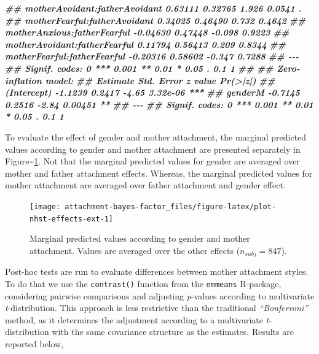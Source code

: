 \documentclass[
]{book}
\newenvironment{Shaded}{\begin{snugshade}}{\end{snugshade}}
\newcommand{\DocumentationTok}[1]{\textcolor[rgb]{0.56,0.35,0.01}{\textbf{\textit{#1}}}}
\begin{document}
\begin{Shaded}
\begin{Highlighting}[]
\DocumentationTok{\#\# motherAvoidant:fatherAvoidant  0.63111    0.32765   1.926   0.0541 .  }
\DocumentationTok{\#\# motherFearful:fatherAvoidant   0.34025    0.46490   0.732   0.4642    }
\DocumentationTok{\#\# motherAnxious:fatherFearful   {-}0.04630    0.47448  {-}0.098   0.9223    }
\DocumentationTok{\#\# motherAvoidant:fatherFearful   0.11794    0.56413   0.209   0.8344    }
\DocumentationTok{\#\# motherFearful:fatherFearful   {-}0.20316    0.58602  {-}0.347   0.7288    }
\DocumentationTok{\#\# {-}{-}{-}}
\DocumentationTok{\#\# Signif. codes:  0 \textquotesingle{}***\textquotesingle{} 0.001 \textquotesingle{}**\textquotesingle{} 0.01 \textquotesingle{}*\textquotesingle{} 0.05 \textquotesingle{}.\textquotesingle{} 0.1 \textquotesingle{} \textquotesingle{} 1}
\DocumentationTok{\#\# }
\DocumentationTok{\#\# Zero{-}inflation model:}
\DocumentationTok{\#\#             Estimate Std. Error z value Pr(\textgreater{}|z|)    }
\DocumentationTok{\#\# (Intercept)  {-}1.1239     0.2417   {-}4.65 3.32e{-}06 ***}
\DocumentationTok{\#\# genderM      {-}0.7145     0.2516   {-}2.84  0.00451 ** }
\DocumentationTok{\#\# {-}{-}{-}}
\DocumentationTok{\#\# Signif. codes:  0 \textquotesingle{}***\textquotesingle{} 0.001 \textquotesingle{}**\textquotesingle{} 0.01 \textquotesingle{}*\textquotesingle{} 0.05 \textquotesingle{}.\textquotesingle{} 0.1 \textquotesingle{} \textquotesingle{} 1}
\end{Highlighting}
\end{Shaded}

To evaluate the effect of gender and mother attachment, the marginal predicted values according to gender and mother attachment are presented separately in Figure\textasciitilde\ref{fig:plot-nhst-effects-ext}. Not that the marginal predicted values for gender are averaged over mother and father attachment effects. Whereas, the marginal predicted values for mother attachment are averaged over father attachment and gender effect.

\begin{figure}

{\centering \texttt{[image: attachment-bayes-factor\_files/figure-latex/plot-nhst-effects-ext-1]} 

}

\caption{Marginal predicted values according to gender and mother attachment. Values are averaged over the other effects ($n_{subj} = 847$).}\label{fig:plot-nhst-effects-ext}
\end{figure}

Post-hoc tests are run to evaluate differences between mother attachment styles. To do that we use the \texttt{contrast()} function from the \texttt{emmeans} R-package, considering pairwise comparisons and adjusting \emph{p}-values according to multivariate \emph{t}-distribution. This approach is less restrictive than the traditional \emph{``Bonferroni''} method, as it determines the adjustment according to a multivariate \emph{t}-distribution with the same covariance structure as the estimates. Results are reported below,
\end{document}
